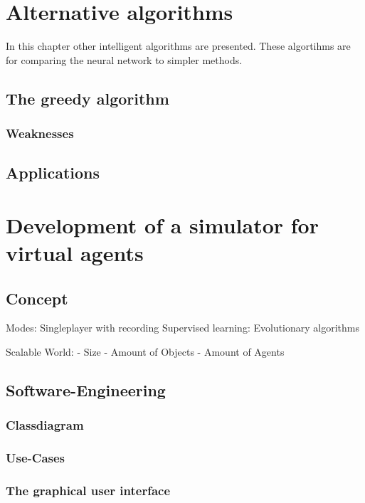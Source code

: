 \documentclass[10pt,a4paper,DIV=11]{scrreprt}
\begin{document}
\chapter{Alternative algorithms}
In this chapter other intelligent algorithms are presented.
These algortihms are for comparing the neural network to simpler
methods.

\section{The greedy algorithm}

\subsection{Weaknesses}

\section{Applications}





\chapter{Development of a simulator for virtual agents}

\section{Concept}



Modes:
Singleplayer with recording
Supervised learning:
Evolutionary algorithms

Scalable World:
- Size
- Amount of Objects
- Amount of Agents

\section{Software-Engineering}

\subsection{Classdiagram}

\subsection{Use-Cases}

\subsection{The graphical user interface}
\end{document}
